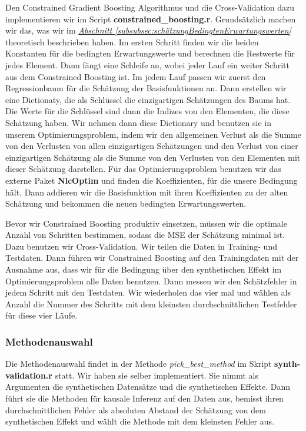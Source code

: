 \documentclass[12pt,a4paper,twoside]{scrartcl}
\numberwithin{equation}{section}
\newcommand{\refsec}[1]{\emph{\hyperref[#1]{Abschnitt \ref*{#1} }}}
\begin{document}
Den Constrained Gradient Boosting Algorithmus und die Cross-Validation dazu implementieren wir im Script \textbf{constrained\_boosting.r}. Grundsätzlich machen wir das, was wir im \refsec{subsubsec:schätzungBedingtenErwartungswerten} theoretisch beschrieben haben. Im ersten Schritt finden wir die beiden Konstanten für die bedingten Erwartungswerte und berechnen die Restwerte für jedes Element. Dann fängt eine Schleife an, wobei jeder Lauf ein weiter Schritt aus dem Constrained Boosting ist. Im jedem Lauf passen wir zuerst den Regressionbaum für die Schätzung der Basisfunktionen an. Dann erstellen wir eine Dictionaty, die als Schlüssel die einzigartigen Schätzungen des Baums hat. Die Werte für die Schlüssel sind dann die Indizes von den Elementen, die diese Schätzung haben. Wir nehmen dann diese Dictionary und benutzen sie in unserem Optimierungsproblem, indem wir den allgemeinen Verlust als die Summe von den Verlusten von allen einzigartigen Schätzungen und den Verlust von einer einzigartigen Schätzung als die Summe von den Verlusten von den Elementen mit dieser Schätzung darstellen. Für das Optimierungsproblem benutzen wir das externe Paket \textbf{NlcOptim} und finden die Ko­ef­fi­zi­enten, für die unsere Bedingung hält. Dann addieren wir die Basisfunktion mit ihren Koeffizienten zu der alten Schätzung und bekommen die neuen bedingten Erwartungswerten.\par 

\noindent
Bevor wir Constrained Boosting produktiv einsetzen, müssen wir die optimale Anzahl von Schritten bestimmen, sodass die MSE der Schätzung minimal ist. Dazu benutzen wir Cross-Validation. Wir teilen die Daten in Training- und Testdaten. Dann führen wir Constrained Boosting auf den Trainingdaten mit der Ausnahme aus, dass wir für die Bedingung über den synthetischen Effekt im Optimierungsproblem alle Daten benutzen. Dann messen wir den Schätzfehler in jedem Schritt mit den Testdaten. Wir wiederholen das vier mal und wählen als Anzahl die Nummer des Schritts mit dem kleinsten durchschnittlichen Testfehler für diese vier Läufe.\par  

\subsubsection{Methodenauswahl}\label{subsubsec:methodenauswahl}
Die Methodenauswahl findet in der Methode \emph{pick\_best\_method} im Skript \textbf{synth-validation.r} statt. Wir haben sie selber implementiert. Sie nimmt als Argumenten die synthetischen Datensätze und die synthetischen Effekte. Dann führt sie die Methoden für kausale Inferenz auf den Daten aus, bemisst ihren durchschnittlichen Fehler als absoluten Abstand der Schätzung von dem synthetischen Effekt und wählt die Methode mit dem kleinsten Fehler aus.\par 
\end{document}
